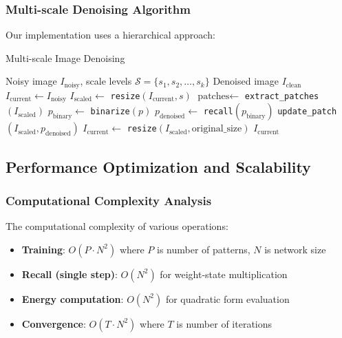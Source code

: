 \documentclass[11pt,a4paper]{article}
\begin{document}
\subsubsection{Multi-scale Denoising Algorithm}

Our implementation uses a hierarchical approach:

\begin{algorithm}[H]
\caption{Multi-scale Image Denoising}
\begin{algorithmic}[1]
\REQUIRE Noisy image $I_{\text{noisy}}$, scale levels $\mathcal{S} = \{s_1, s_2, \ldots, s_k\}$
\ENSURE Denoised image $I_{\text{clean}}$
\STATE $I_{\text{current}} \leftarrow I_{\text{noisy}}$
    \STATE $I_{\text{scaled}} \leftarrow $ \texttt{resize}$(I_{\text{current}}, s)$
    \STATE $\text{patches} \leftarrow $ \texttt{extract\_patches}$(I_{\text{scaled}})$
        \STATE $p_{\text{binary}} \leftarrow $ \texttt{binarize}$(p)$
        \STATE $p_{\text{denoised}} \leftarrow $ \texttt{recall}$(p_{\text{binary}})$
        \STATE \texttt{update\_patch}$(I_{\text{scaled}}, p_{\text{denoised}})$
    \ENDFOR
    \STATE $I_{\text{current}} \leftarrow $ \texttt{resize}$(I_{\text{scaled}}, \text{original\_size})$
\ENDFOR
\RETURN $I_{\text{current}}$
\end{algorithmic}
\end{algorithm}

\subsection{Performance Optimization and Scalability}

\subsubsection{Computational Complexity Analysis}

The computational complexity of various operations:

\begin{itemize}
    \item \textbf{Training}: $O(P \cdot N^2)$ where $P$ is number of patterns, $N$ is network size
    \item \textbf{Recall (single step)}: $O(N^2)$ for weight-state multiplication
    \item \textbf{Energy computation}: $O(N^2)$ for quadratic form evaluation
    \item \textbf{Convergence}: $O(T \cdot N^2)$ where $T$ is number of iterations
\end{itemize}
\end{document}
